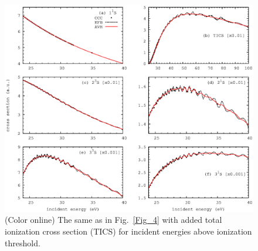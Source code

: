 \documentclass[aip
, pra
, showpacs
, aps
, twocolumn
, groupedaddress
, floatfix
]{revtex4}
\begin{document}
\begin{figure}[htb]
\includegraphics[scale=1]{fig5.ps}
\caption{(Color online)
The same as in Fig.~\ref{Fig_4} with added total ionization cross section (TICS)
for incident energies above ionization threshold.
}
\label{Fig_5}
\end{figure}
\end{document}
